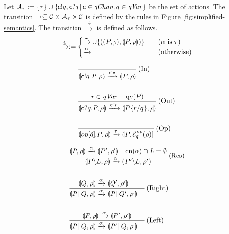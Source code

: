 \begin{defi}
\label{symqccs:simpletrans}
Let $\mathcal{A}_{\tau} := \{\tau\} \cup
 \{\mathsf{c}! q,\mathsf{c}? q \,|\, \mathsf{c} \in \mathit{qChan}, q \in 
\mathit{qVar} \}$ be the set of actions.
The transition $\rightarrow \subseteq \mathcal{C} \times \mathcal{A}_{\tau} \times \mathcal{C}$ is 
defined by the rules in Figure \ref{fig:simplified-semantics}.
The transition $\xrightarrow{\hat \alpha}$ is defined as follows.
\[
 \xrightarrow{\hat \alpha} := \begin{cases}
			       \xrightarrow{\tau} \cup \{(\llparenthesis P, \rho \rrparenthesis,
			       \llparenthesis P, \rho \rrparenthesis)\}~~~&(\alpha
			       \mbox{ is } \tau)\\
			       \xrightarrow{\alpha}~~~&(\mbox{otherwise})
			      \end{cases} 
\]
\begin{figure}[htbp]
\begin{minipage}{0.5\hsize}
\begin{align*}
&\frac{}
{\llparenthesis \mathsf{c}! q.P, \rho \rrparenthesis \xrightarrow{\mathsf{c}! q}
\llparenthesis P, \rho \rrparenthesis}
\,\mbox{(In)}\\
\\
&\frac{r \in \mathit{qVar} - \mathrm{qv}(P)}
{\llparenthesis \mathsf{c}? q.P, \rho \rrparenthesis \xrightarrow{\mathsf{c}? r}
\llparenthesis P\{r / q\}, \rho \rrparenthesis}
\,\mbox{(Out)}\\
\\
&\frac{}
{\llparenthesis op[\tilde q].P, \rho \rrparenthesis \xrightarrow{\tau} 
\llparenthesis P, \mathcal{E}^\mathit{op}_{\tilde q}(\rho) \rrparenthesis}
\,\mbox{(Op)}
\end{align*}
\end{minipage}
\begin{minipage}{0.5\hsize}
 \begin{align*}
&\frac{
\llparenthesis P, \rho \rrparenthesis \xrightarrow{\alpha} 
\llparenthesis P', \rho' \rrparenthesis~~~
\mathrm{cn}(\alpha) \cap L = \emptyset
}
{
\llparenthesis P \backslash L, \rho \rrparenthesis \xrightarrow{\alpha} 
\llparenthesis P' \backslash L, \rho' \rrparenthesis
}\,\mbox{(Res)}\\
\\
&\frac{
\llparenthesis Q, \rho \rrparenthesis \xrightarrow{\alpha} 
\llparenthesis Q', \rho' \rrparenthesis~~~
}
{
\llparenthesis P||Q, \rho \rrparenthesis \xrightarrow{\alpha} 
\llparenthesis P||Q', \rho' \rrparenthesis~~~
}\,\mbox{(Right)}\\
\\
&\frac{
\llparenthesis P, \rho \rrparenthesis \xrightarrow{\alpha} 
\llparenthesis P', \rho' \rrparenthesis
}
{
\llparenthesis P||Q, \rho \rrparenthesis \xrightarrow{\alpha} 
\llparenthesis P'||Q, \rho' \rrparenthesis~~~
}\,\mbox{(Left)}
 \end{align*}
\end{minipage}


\end{figure}
\end{defi}
